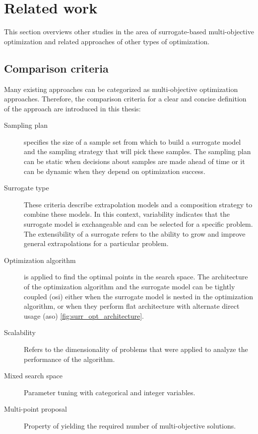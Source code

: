 \chapter{Related work}\label{sec:related}

    This section overviews other studies in the area of surrogate-based multi-objective optimization and related approaches of other types of optimization.


    \section{Comparison criteria}
        Many existing approaches can be categorized as multi-objective optimization approaches. Therefore, the comparison criteria for a clear and concise definition of the approach are introduced in this thesis:
        \begin{description}
            \item[Sampling plan] specifies the size of a sample set from which to build a surrogate model and the sampling strategy that will pick these samples. The sampling plan can be static when decisions about samples are made ahead of time or it can be dynamic when they depend on optimization success.
            \item[Surrogate type] These criteria describe extrapolation models and a composition strategy to combine these models. In this context, variability indicates that the surrogate model is exchangeable and can be selected for a specific problem. The extensibility of a surrogate refers to the ability to grow and improve general extrapolations for a particular problem.
            \item[Optimization algorithm] is applied to find the optimal points in the search space. The architecture of the optimization algorithm and the surrogate model can be tightly coupled (\gls{osi}) either when the surrogate model is nested in the optimization algorithm, or when they perform flat architecture with alternate direct usage (\gls{aso}) \ref{fig:surr_opt_architecture}.
            \item[Scalability] Refers to the dimensionality of problems that were applied to analyze the performance of the algorithm.
            \item[Mixed search space] Parameter tuning with categorical and integer variables.
            \item[Multi-point proposal] Property of yielding the required number of multi-objective solutions.
        \end{description}

